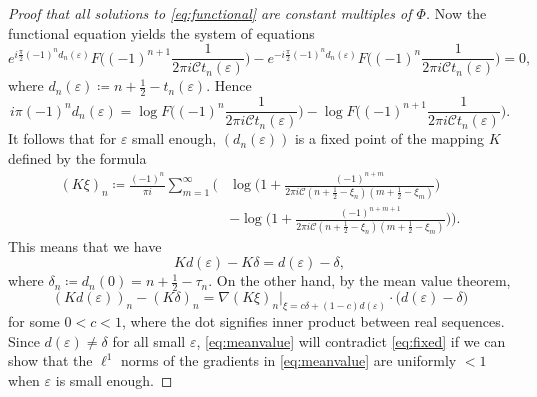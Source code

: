 \documentclass[12pt]{amsart}
\theoremstyle{plain}
\numberwithin{equation}{section}
\theoremstyle{definition}
\begin{document}
\begin{proof}[Proof that all solutions to \eqref{eq:functional} are  constant multiples of $\Phi$]
Now the functional equation yields the system of equations
\[ e^{i\frac{\pi}{2}(-1)^nd_n(\varepsilon)} F\big((-1)^{n+1} \frac{1}{2\pi i \mathscr{C}t_n(\varepsilon) }\big)-e^{-i\frac{\pi}{2}(-1)^nd_n(\varepsilon)} F\big((-1)^n\frac{1}{2\pi i \mathscr{C} t_n(\varepsilon)}\big)=0, \]
where $d_n(\varepsilon)\coloneqq n+\frac12-t_n(\varepsilon)$.
Hence
\[ i\pi (-1)^n d_n(\varepsilon) = \log F\big((-1)^n\frac{1}{2\pi i \mathscr{C} t_n(\varepsilon)}\big) -  \log F\big((-1)^{n+1} \frac{1}{2\pi i \mathscr{C}t_n(\varepsilon) }\big) . \]
It follows that for $\varepsilon$ small enough, $(d_n(\varepsilon))$ is a fixed point of the mapping $K$ defined by the formula
\begin{align*} (K\xi)_n\coloneqq \frac{(-1)^n}{\pi i} \sum_{m=1}^\infty  \Big(& \log\Big(1+\frac{(-1)^{n+m}}{2\pi i \mathscr{C}(n+\frac12-\xi_n)(m+\frac12-\xi_m)}\Big)\\
	& -\log\Big(1+\frac{(-1)^{n+m+1}}{2\pi i \mathscr{C}(n+\frac12-\xi_n)(m+\frac12-\xi_m)}\Big)\Big).\end{align*}
This means that we have
\begin{equation} \label{eq:fixed} Kd(\varepsilon)-K\delta   =d(\varepsilon)-\delta, \end{equation}
where $\delta_n\coloneqq d_n(0)=n+\frac12-\tau_n$. On the other hand, by the mean value theorem,
\begin{equation} \label{eq:meanvalue} (Kd(\varepsilon))_n-(K\delta)_n=\nabla (K\xi)_n \big|_{\xi=c\delta+(1-c)d(\varepsilon)} \cdot \big(d(\varepsilon)-\delta\big) \end{equation}
for some $0<c<1$, where the dot signifies inner product between real sequences. Since $d(\varepsilon)\neq \delta$ for all small $\varepsilon$, \eqref{eq:meanvalue} will contradict \eqref{eq:fixed} if we can show that the $\ell^1$ norms of the gradients in \eqref{eq:meanvalue} are uniformly $<1$ when $\varepsilon$ is small enough. 


\end{proof}
\end{document}
